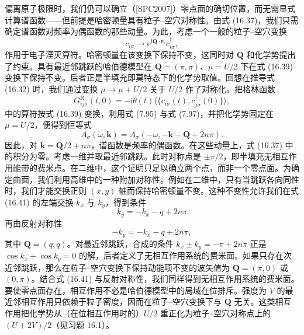 偏离原子极限时，我们仍可以确立（[SPC2007]）零点面的确切位置，而无需显式计算谱函数——但前提是哈密顿量具有粒子--空穴对称性。由式 (16.37)，我们只需确定谱函数对频率为偶函数的那些动量。为此，考虑一个一般的粒子--空穴变换
\begin{equation*}
c_{i\sigma}\to\mathrm{e}^{\mathrm{i}\mathbf{Q}\cdot\mathbf{r}_{i}}c^{\dagger}_{i\sigma},\tag{16.39}
\end{equation*}
作用于电子湮灭算符。哈密顿量在该变换下保持不变，这同时对 $\mathbf{Q}$ 和化学势提出了约束。具有最近邻跳跃的哈伯德模型在 $\mathbf{Q}=(\pi,\pi)$、$\mu=U/2$ 下在式 (16.39) 变换下保持不变。后者正是半填充即莫特态下的化学势取值。回想在推导式 (16.32) 时，我们通过变换 $\mu\to\mu+U/2$ 关于 $U/2$ 作了对称化。把格林函数
\begin{equation*}
G^{\mathrm{R}}_{ij\sigma}(t,0)=-\mathrm{i}\theta(t)\langle\{c_{i\sigma}(t),c^{\dagger}_{j\sigma}(0)\}\rangle,\tag{16.40}
\end{equation*}
中的算符按式 (16.39) 变换，利用式 (7.95) 与式 (7.97)，并把化学势固定在 $\mu=U/2$，便得到恒等式
\begin{equation*}
A_{\sigma}(\omega,\mathbf{k})=A_{\sigma}(-\omega,-\mathbf{k}-\mathbf{Q}+2n\pi).\tag{16.41}
\end{equation*}
因此，对 $\mathbf{k}=\mathbf{Q}/2+n\pi$，谱函数是频率的偶函数。在这些动量上，式 (16.37) 中的积分为零。考虑一维并取最近邻跳跃。此时对称点是 $\pm\pi/2$，即半填充无相互作用能带的费米点。在二维中，这个证明只足以确立两个点，而非一个零点面。为确定曲面，我们利用高维中的一种附加对称性。例如在二维中，只有当跳跃各向同性时，我们才能交换正则 $(x,y)$ 轴而保持哈密顿量不变。这种不变性允许我们在式 (16.41) 的左端交换 $k_{x}$ 与 $k_{y}$，得到条件
\begin{equation*}
k_{y}=-k_{x}-q+2n\pi\tag{16.42}
\end{equation*}
再由反射对称性
\begin{equation*}
-k_{y}=-k_{x}-q+2n\pi,\tag{16.43}
\end{equation*}
其中 $\mathbf{Q}=(q,q)$。对最近邻跳跃，合成的条件 $k_{x}\pm k_{y}=-\pi+2n\pi$ 正是 $\cos k_{x}+\cos k_{y}=0$ 的解，后者定义了无相互作用系统的费米面。如果只存在次近邻跳跃，那么在粒子--空穴变换下保持动能项不变的波矢值为 $\mathbf{Q}=(\pi,0)$ 或 $(0,\pi)$。结合式 (16.41) 与反射对称性，我们同样得到无相互作用系统的费米面。要使零点面存在，相互作用不必是哈伯德模型中的局域在位排斥。强度为 $V$ 的最近邻相互作用只依赖于粒子密度，因而在粒子--空穴变换下与 $\mathbf{Q}$ 无关。这类相互作用把化学势从（在位相互作用时的）$U/2$ 重正化为粒子--空穴对称点上的 $(U+2V)/2$（见习题 16.1）。

